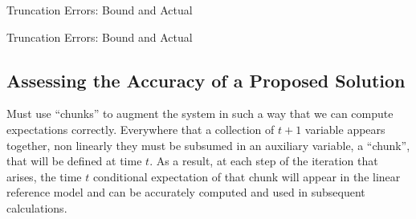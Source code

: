 \documentclass[12pt]{article}
\begin{document}


 \begin{table}
   \centering
    


   \caption{Truncation Errors: Bound and Actual}
 \label{truncTab}
 \end{table}



 \begin{table}
   \centering




   \caption{Truncation Errors: Bound and Actual}

 \end{table}

\subsection{Assessing the Accuracy of a Proposed Solution}
\label{sec:decis-rule-assessm}

Must use ``chunks'' to augment the system in such a way that we
can compute expectations correctly.
Everywhere that a collection of 
$t+1$ variable appears together, non linearly they must be subsumed in an
auxiliary variable, a ``chunk'', 
that will be defined at time $t$.  As a result, at each step
of the iteration that arises, the time $t$
conditional expectation of that chunk will appear in the 
linear reference model and can be accurately computed and
used in subsequent calculations.
\end{document}
